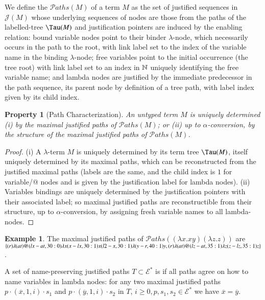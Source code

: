 \documentclass{elsarticle}
\theoremstyle{plain}
\newtheorem{property}[theorem]{Property}
\theoremstyle{definition}
\newtheorem{example}{Example}[section]
\def\nameencoding{\mathcal{E}} %
\newcommand{\ctree}{\Tau} %
\newcommand\pathset{{\mathcal{P}aths}} %
\def\justseqset{\mathcal{J}}
\begin{document}
We define the  $\pathset(M)$ of a term $M$ as the set of justified sequences in $\justseqset(M)$
whose underlying sequences of nodes are those from the paths of the labelled-tree $\ctree(M)$ and justification pointers are induced by the enabling relation:
 bound variable nodes point to their binder $\lambda$-node, which necessarily occurs in the path to the root, with link label set to the index of the variable name in the binding $\lambda$-node;
 free variables point to the initial occurrence (the tree root) with link label  set to an index in $\mathbb{N}$ uniquely identifying the
 free variable name;
 and lambda nodes are justified by the immediate predecessor in the path sequence, its parent node by definition of a tree path, with label index given by its child index.
\begin{property}[Path Characterization]
\label{prop:tree_path_charact}
 An untyped term $M$ is uniquely determined
(i) by the maximal justified paths of $\pathset(M)$;
or (ii) up to $\alpha$-conversion, by the \emph{structure} of the maximal justified paths of $\pathset(M)$.
\end{property}
\begin{proof}
(i) A $\lambda$-term $M$ is uniquely determined by its term tree $\ctree(M)$, itself uniquely determined by its maximal paths, which can be reconstructed from the justified maximal paths (labels are the same, and the child index is $1$ for variable/@ nodes and is given by the justification label for lambda nodes).
%
(ii) Variables bindings are uniquely determined by the justification pointers with their associated label; so maximal justified paths are  reconstructible from their structure, up to $\alpha$-conversion, by assigning fresh variable names to all lambda-nodes.
\end{proof}

\begin{example}
    The maximal justified paths of
  $\pathset((\lambda x.x y) (\lambda z.z))$
  are
  $\{
  \Pstr{ (r){\lambda} (at){@} (lx-at,30:0){\lambda x} (x-lx,30:1){x} (l2-x,30:1){\lambda} (y-r,40:1){y} },
  \Pstr{ (r){\lambda} (at){@} (lz-at,35:1){\lambda z} (z-lz,35:1){z}}
  \}$.
\end{example}

A set of name-preserving justified paths $T\subset \nameencoding^*$ is  if all paths agree on how to name variables in lambda nodes: for any two maximal justified paths $p \cdot (\overline{x}, 1, i) \cdot s_1$ and $p \cdot (\overline{y}, 1, i) \cdot s_2$ in $T$, $i\geq 0,p,s_1,s_2\in \nameencoding^*$
we have $\overline{x} = \overline{y}$.
\end{document}

